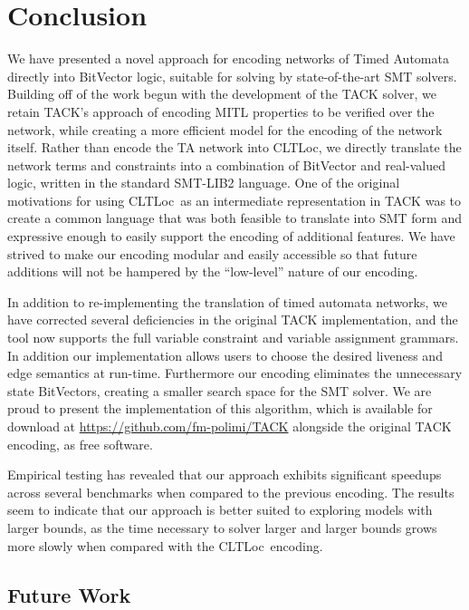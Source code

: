 \documentclass[a4paper,11pt]{report}
\theoremstyle{definition}
\newcommand{\cltloc}{CLTLoc}
\begin{document}
\chapter{Conclusion}\label{conclusion}

We have presented a novel approach for encoding networks of Timed Automata
directly into BitVector logic, suitable for solving by state-of-the-art SMT
solvers. Building off of the work begun with the development of the TACK solver,
we retain TACK's approach of encoding MITL properties to be verified over the
network, while creating a more efficient model for the encoding of the network
itself. Rather than encode the TA network into \cltloc, we directly translate
the network terms and constraints into a combination of BitVector and
real-valued logic, written in the standard SMT-LIB2 language. One of the
original motivations for using \cltloc\ as an intermediate representation in
TACK was to create a common language that was both feasible to translate into
SMT form and expressive enough to easily support the encoding of additional
features. We have strived to make our encoding modular and easily accessible so
that future additions will not be hampered by the ``low-level'' nature of our
encoding.

In addition to re-implementing the translation of timed automata networks, we
have corrected several deficiencies in the original TACK implementation, and
the tool now supports the full variable constraint and variable assignment
grammars. In addition our implementation allows users to choose the desired
liveness and edge semantics at run-time. Furthermore our encoding eliminates the
unnecessary state BitVectors, creating a smaller search space for the SMT
solver. We are proud to present the implementation of this algorithm, which is
available for download at \url{https://github.com/fm-polimi/TACK} alongside the
original TACK encoding, as free software.

Empirical testing has revealed that our approach exhibits significant speedups
across several benchmarks when compared to the previous encoding. The results
seem to indicate that our approach is better suited to exploring models with
larger bounds, as the time necessary to solver larger and larger bounds grows
more slowly when compared with the \cltloc\ encoding.

\section{Future Work}
\end{document}
